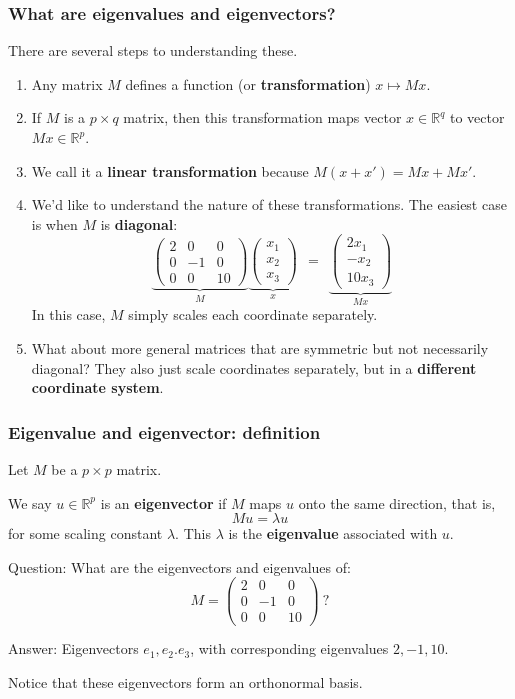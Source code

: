 \documentclass[smaller]{beamer}
\def\R{{\mathbb R}}
\def\darkred{\color{red!70!black}}
\def\darkgreen{\color{green!60!black}}
\def\v2{{\vskip.2in}}
\def\R{{\mathbb R}}
\begin{document}
\begin{frame}
\frametitle{What are eigenvalues and eigenvectors?}

{\darkgreen There are several steps to understanding these.}
\begin{enumerate}
\item<2-> Any matrix $M$ defines a function (or {\bf transformation}) $x \mapsto Mx$.
\item<3-> If $M$ is a $p \times q$ matrix, then this transformation maps vector $x \in \R^q$ to vector $Mx \in \R^p$.
\item<4-> We call it a {\bf linear transformation} because $M(x + x') = Mx + Mx'$.
\item<5-> We'd like to understand the nature of these transformations. The easiest case is when $M$ is {\bf diagonal}:
$$
\underbrace{\begin{pmatrix}
2 & 0 & 0 \\
0 & -1 & 0 \\
0 & 0 & 10
\end{pmatrix}}_{M}
\underbrace{\begin{pmatrix} x_1 \\ x_2 \\ x_3 \end{pmatrix}}_{x}
\ \ = \ \ 
\underbrace{\begin{pmatrix} 2x_1 \\ -x_2 \\ 10x_3 \end{pmatrix}}_{Mx}
$$
In this case, $M$ simply scales each coordinate separately.
\item<6-> What about more general matrices that are symmetric but not necessarily diagonal? They also just scale coordinates separately, but in a {\bf different coordinate system}.
\end{enumerate}
\end{frame}

\begin{frame}
\frametitle{Eigenvalue and eigenvector: definition}

{\darkred 
Let $M$ be a $p \times p$ matrix. 

We say $u \in \R^p$ is an {\bf eigenvector} if $M$ maps $u$ onto the same direction, that is,
$$ Mu = \lambda u$$
for some scaling constant $\lambda$. This $\lambda$ is the {\bf eigenvalue} associated with $u$.}

\pause\v2
Question: What are the eigenvectors and eigenvalues of:
$$ M = \begin{pmatrix}
2 & 0 & 0 \\
0 & -1 & 0 \\
0 & 0 & 10
\end{pmatrix} \ ?
$$

\pause
Answer: Eigenvectors $e_1, e_2. e_3$, with corresponding eigenvalues $2,-1,10$.

\pause\v2
\alert{Notice that these eigenvectors form an orthonormal basis.}
\end{frame}
\end{document}
